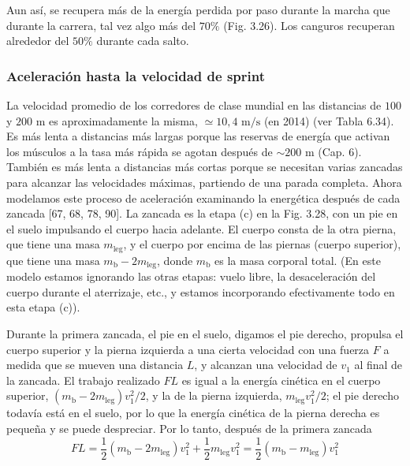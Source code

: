\documentclass[12pt]{book}
\begin{document}
Aun así, se recupera más de la energía perdida por paso durante la marcha que durante la carrera, tal vez algo más del $70\%$ (Fig. 3.26). Los canguros recuperan alrededor del $50\%$ durante cada salto.

\subsubsection*{Aceleración hasta la velocidad de sprint}

La velocidad promedio de los corredores de clase mundial en las distancias de $100$ y $200\text{ m}$ es aproximadamente la misma, $\simeq 10,4\text{ m/s}$ (en 2014) (ver Tabla 6.34). Es más lenta a distancias más largas porque las reservas de energía que activan los músculos a la tasa más rápida se agotan después de $\sim 200\text{ m}$ (Cap. 6). También es más lenta a distancias más cortas porque se necesitan varias zancadas para alcanzar las velocidades máximas, partiendo de una parada completa. Ahora modelamos este proceso de aceleración examinando la energética después de cada zancada [67, 68, 78, 90]. La zancada es la etapa (c) en la Fig. 3.28, con un pie en el suelo impulsando el cuerpo hacia adelante. El cuerpo consta de la otra pierna, que tiene una masa $m_{\text{leg}}$, y el cuerpo por encima de las piernas (cuerpo superior), que tiene una masa $m_{\text{b}} - 2m_{\text{leg}}$, donde $m_{\text{b}}$ es la masa corporal total. (En este modelo estamos ignorando las otras etapas: vuelo libre, la desaceleración del cuerpo durante el aterrizaje, etc., y estamos incorporando efectivamente todo en esta etapa (c)).

Durante la primera zancada, el pie en el suelo, digamos el pie derecho, propulsa el cuerpo superior y la pierna izquierda a una cierta velocidad con una fuerza $F$ a medida que se mueven una distancia $L$, y alcanzan una velocidad de $v_1$ al final de la zancada. El trabajo realizado $FL$ es igual a la energía cinética en el cuerpo superior, $(m_{\text{b}} - 2m_{\text{leg}}) v_1^2 / 2$, y la de la pierna izquierda, $m_{\text{leg}} v_1^2 / 2$; el pie derecho todavía está en el suelo, por lo que la energía cinética de la pierna derecha es pequeña y se puede despreciar. Por lo tanto, después de la primera zancada
\begin{equation}
FL = \frac{1}{2}(m_{\text{b}} - 2m_{\text{leg}})v_1^2 + \frac{1}{2}m_{\text{leg}}v_1^2 = \frac{1}{2}(m_{\text{b}} - m_{\text{leg}})v_1^2
\label{eq:3.38}
\end{equation}
\end{document}
